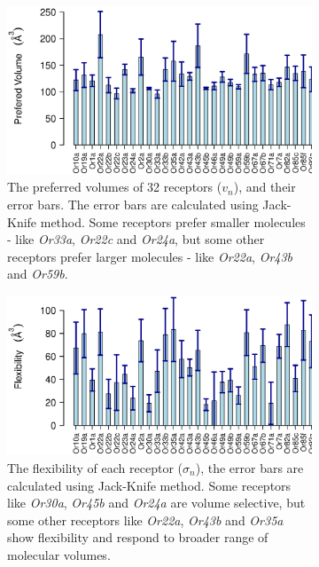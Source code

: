 \documentclass[11pt]{paper} %
\newcommand{\numberofreceptors}{32 }
\begin{document}
\begin{figure}
	\begin{subfigure}[b]{\textwidth}
		\includegraphics[width=\textwidth]{fig/mean-vol}
		\caption{The preferred volumes of \numberofreceptors receptors ($v_n$), and their error bars. 
		The error bars are calculated using Jack-Knife method. 
		Some receptors prefer smaller molecules - like {\it Or33a}, {\it Or22c} and {\it Or24a}, 
		but some other receptors prefer larger molecules - like {\it Or22a}, {\it Or43b} and {\it Or59b}.}
		\label{fig:preferred_volume}
	\end{subfigure}
	\begin{subfigure}[b]{\textwidth}
		\includegraphics[width=\textwidth]{fig/std-vol}
		\caption{The flexibility of each receptor ($\sigma_n$), the error bars are calculated using Jack-Knife method.
			Some receptors like {\it Or30a}, {\it Or45b} and {\it Or24a} are volume  selective, 
			but some other receptors like {\it Or22a}, {\it Or43b} and {\it Or35a} show flexibility and respond to broader range of molecular volumes.
		}
		\label{fig:volume_flexibility}
	\end{subfigure}
	\caption{}
\end{figure}
\end{document}
